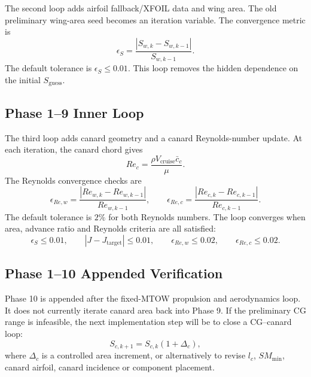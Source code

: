 The second loop adds airfoil fallback/XFOIL data and wing area. The old preliminary wing-area seed becomes an iteration variable. The convergence metric is
\begin{equation}
    \epsilon_S =
    \frac{|S_{w,k}-S_{w,k-1}|}{S_{w,k-1}}.
    \label{eq:ppa_area_convergence}
\end{equation}
The default tolerance is \(\epsilon_S \leq 0.01\). This loop removes the hidden dependence on the initial \(S_{\mathrm{guess}}\).

\subsection{Phase 1--9 Inner Loop}

The third loop adds canard geometry and a canard Reynolds-number update. At each iteration, the canard chord gives
\begin{equation}
    Re_c =
    \frac{\rho V_{\mathrm{cruise}}\bar{c}_c}{\mu}.
    \label{eq:ppa_canard_re}
\end{equation}
The Reynolds convergence checks are
\begin{equation}
    \epsilon_{Re,w} =
    \frac{|Re_{w,k}-Re_{w,k-1}|}{Re_{w,k-1}},
    \qquad
    \epsilon_{Re,c} =
    \frac{|Re_{c,k}-Re_{c,k-1}|}{Re_{c,k-1}}.
    \label{eq:ppa_re_convergence}
\end{equation}
The default tolerance is \(2\%\) for both Reynolds numbers. The loop converges when area, advance ratio and Reynolds criteria are all satisfied:
\begin{equation}
    \epsilon_S \leq 0.01,
    \qquad
    |J-J_{\mathrm{target}}|\leq0.01,
    \qquad
    \epsilon_{Re,w}\leq0.02,
    \qquad
    \epsilon_{Re,c}\leq0.02 .
    \label{eq:ppa_inner_convergence}
\end{equation}

\subsection{Phase 1--10 Appended Verification}

Phase 10 is appended after the fixed-MTOW propulsion and aerodynamics loop. It does not currently iterate canard area back into Phase 9. If the preliminary CG range is infeasible, the next implementation step will be to close a CG--canard loop:
\begin{equation}
    S_{c,k+1} =
    S_{c,k}(1+\Delta_c),
    \label{eq:ppa_canard_area_update}
\end{equation}
where \(\Delta_c\) is a controlled area increment, or alternatively to revise \(l_c\), \(SM_{\min}\), canard airfoil, canard incidence or component placement.

